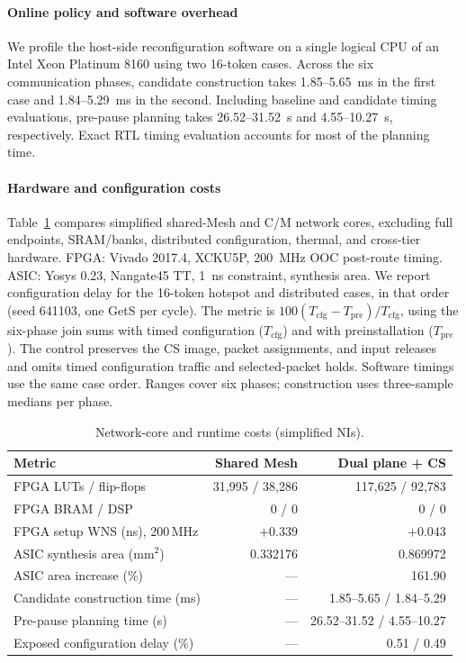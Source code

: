 \documentclass[conference,10pt]{IEEEtran}
\begin{document}
\paragraph{Online policy and software overhead}
We profile the host-side reconfiguration software on a single logical CPU
of an Intel Xeon Platinum 8160 using two 16-token cases. Across the six
communication phases, candidate construction takes 1.85--5.65~ms in the
first case and 1.84--5.29~ms in the second. Including baseline and candidate
timing evaluations, pre-pause planning takes 26.52--31.52~s and
4.55--10.27~s, respectively. Exact RTL timing evaluation accounts for most
of the planning time.

\paragraph{Hardware and configuration costs}
Table~\ref{tab:eval-cost} compares simplified shared-Mesh and C/M network
cores, excluding full endpoints, SRAM/banks, distributed configuration,
thermal, and cross-tier hardware. FPGA: Vivado 2017.4, XCKU5P, 200~MHz
OOC post-route timing. ASIC: Yosys 0.23, Nangate45 TT, 1~ns constraint,
synthesis area. We report configuration delay for the 16-token hotspot and
distributed cases, in that order (seed 641103, one GetS per cycle). The
metric is $100(T_{\mathrm{cfg}}-T_{\mathrm{pre}})/T_{\mathrm{cfg}}$, using the
six-phase join sums with timed configuration ($T_{\mathrm{cfg}}$) and with
preinstallation ($T_{\mathrm{pre}}$). The control preserves the CS image,
packet assignments, and input releases and omits timed configuration
traffic and selected-packet holds. Software timings use the same case order.
Ranges cover six phases; construction uses three-sample medians per phase.

\begin{table}[!ht]
\caption{Network-core and runtime costs (simplified NIs).}
\label{tab:eval-cost}
\centering\scriptsize
\renewcommand{\arraystretch}{1.20}
\begin{tabularx}{\columnwidth}{@{}>{\raggedright\arraybackslash}Xrr@{}}
\toprule
Metric & Shared Mesh & Dual plane + CS \\
\midrule
FPGA LUTs / flip-flops & 31,995 / 38,286 & 117,625 / 92,783 \\
FPGA BRAM / DSP & 0 / 0 & 0 / 0 \\
FPGA setup WNS (ns), 200\,MHz & $+0.339$ & $+0.043$ \\
ASIC synthesis area (mm$^2$) & 0.332176 & 0.869972 \\
ASIC area increase (\%) & --- & 161.90 \\
\midrule
Candidate construction time (ms) & --- & 1.85--5.65 / 1.84--5.29 \\
Pre-pause planning time (s) & --- & 26.52--31.52 / 4.55--10.27 \\
Exposed configuration delay (\%) & --- & 0.51 / 0.49 \\
\bottomrule
\end{tabularx}
\end{table}
\end{document}
